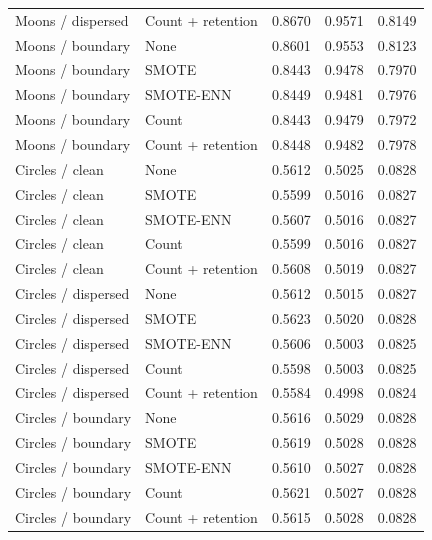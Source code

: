 \begin{table}[htbp]
\begin{tabular}{llrrr}
Moons / dispersed & Count + retention & 0.8670 & 0.9571 & 0.8149 \\
Moons / boundary & None & 0.8601 & 0.9553 & 0.8123 \\
Moons / boundary & SMOTE & 0.8443 & 0.9478 & 0.7970 \\
Moons / boundary & SMOTE-ENN & 0.8449 & 0.9481 & 0.7976 \\
Moons / boundary & Count & 0.8443 & 0.9479 & 0.7972 \\
Moons / boundary & Count + retention & 0.8448 & 0.9482 & 0.7978 \\
Circles / clean & None & 0.5612 & 0.5025 & 0.0828 \\
Circles / clean & SMOTE & 0.5599 & 0.5016 & 0.0827 \\
Circles / clean & SMOTE-ENN & 0.5607 & 0.5016 & 0.0827 \\
Circles / clean & Count & 0.5599 & 0.5016 & 0.0827 \\
Circles / clean & Count + retention & 0.5608 & 0.5019 & 0.0827 \\
Circles / dispersed & None & 0.5612 & 0.5015 & 0.0827 \\
Circles / dispersed & SMOTE & 0.5623 & 0.5020 & 0.0828 \\
Circles / dispersed & SMOTE-ENN & 0.5606 & 0.5003 & 0.0825 \\
Circles / dispersed & Count & 0.5598 & 0.5003 & 0.0825 \\
Circles / dispersed & Count + retention & 0.5584 & 0.4998 & 0.0824 \\
Circles / boundary & None & 0.5616 & 0.5029 & 0.0828 \\
Circles / boundary & SMOTE & 0.5619 & 0.5028 & 0.0828 \\
Circles / boundary & SMOTE-ENN & 0.5610 & 0.5027 & 0.0828 \\
Circles / boundary & Count & 0.5621 & 0.5027 & 0.0828 \\
Circles / boundary & Count + retention & 0.5615 & 0.5028 & 0.0828 \\
\hline
\end{tabular}
\end{table}
\clearpage
